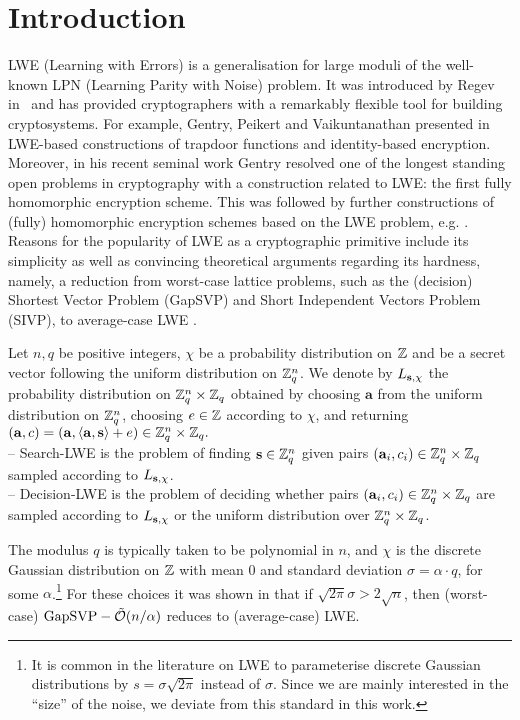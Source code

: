 \section{Introduction} \label{sec:intro}
LWE (Learning with Errors) is a generalisation for large moduli of the well-known LPN (Learning Parity with Noise) problem. It was introduced by Regev in~\cite{regev:acm09} and has provided cryptographers with a remarkably flexible tool for building cryptosystems. For example, Gentry, Peikert and Vaikuntanathan presented in~\cite{GPV08} LWE-based constructions of trapdoor functions and identity-based encryption. Moreover, in his recent seminal work Gentry \cite{Gentry09:phd} resolved one of the longest standing open problems in  cryptography with a construction related to LWE: the first fully homomorphic encryption scheme. This was followed by further constructions of (fully) homomorphic encryption schemes based on the LWE problem, e.g. \cite{albrecht-farshim-faugere-perret:asiacrypt2011,Brakerski2011a}. 
Reasons for the popularity of LWE as a cryptographic primitive include its simplicity as well as convincing theoretical arguments regarding its hardness, namely, a  reduction from worst-case lattice problems, such as the (decision) Shortest Vector Problem (GapSVP) and Short Independent Vectors Problem (SIVP), to average-case LWE \cite{regev:acm09,brakerski-langlois-peikert-regev-stehle:stoc13}.  
\begin{definition}\label{def:lwe}Let $n, q$ be positive integers, $\chi$ be a probability distribution on $\mathbb{Z}$ and \svec be a secret vector following the uniform distribution on $\mathbb{Z}_q^n$. We denote by $L_{\mathbf{s},\chi}$ the probability distribution on $\mathbb{Z}_q^n \times \mathbb{Z}_q$ obtained by choosing $\mathbf{a}$ from the uniform distribution on $\mathbb{Z}_q^n$, choosing $e \in \mathbb{Z}$ according to $\chi$, and returning  $(\mathbf{a},c)=(\mathbf{a},\langle {\ensuremath{\mathbf{a}}},{\mathbf{s}}\rangle+ e) \in \mathbb{Z}_q^n \times \mathbb{Z}_q.$\\
-- \textnormal{Search-LWE} is the problem of finding $\mathbf{s} \in \mathbb{Z}_q^n$ given pairs $(\mathbf{a}_i, c_i) \in \mathbb{Z}_q^n \times \mathbb{Z}_q$ sampled according to $L_{\mathbf{s},\chi}$.\\
-- \textnormal{Decision-LWE} is the problem of deciding whether pairs $(\mathbf{a}_i, c_i) \in \mathbb{Z}_q^n \times \mathbb{Z}_q$ are sampled according to $L_{\mathbf{s},\chi}$ or the uniform distribution over $\mathbb{Z}_q^n \times \mathbb{Z}_q$.
\end{definition}
The modulus $q$ is typically taken to be polynomial in $n$, and $\chi$ is the discrete Gaussian distribution on $\mathbb{Z}$ with mean $0$ and standard deviation $\sigma = \alpha \cdot q$, 
for some $\alpha$.\footnote{It is common in the literature on LWE to parameterise discrete Gaussian distributions by $s = \sigma\sqrt{2\pi}$ instead of $\sigma$. Since we are mainly interested in the ``size'' of the noise, we deviate from this standard in this work.} For these choices it was shown in \cite{regev:acm09,brakerski-langlois-peikert-regev-stehle:stoc13} that if $\sqrt{2\pi} \sigma > 2\sqrt{n}$, then (worst-case) ${\rm GapSVP}-\tilde{\mathcal{O}}(n/\alpha)$ reduces to (average-case) LWE.

